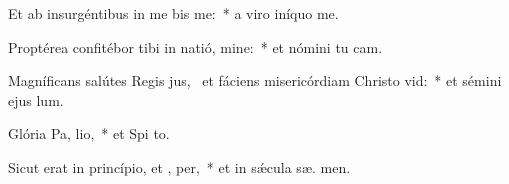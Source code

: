 \item Et ab insurgéntibus in me bis me:~* a viro iníquo  me.
\item Proptérea confitébor tibi in natió, mine:~* et nómini tu  cam.
\item Magníficans salútes Regis jus,~\pscross{} et fáciens misericórdiam Christo  vid:~* et sémini ejus   lum.
\item Glória Pa,  lio,~* et Spi to.
\item Sicut erat in princípio, et ,  per,~* et in sǽcula sæ. men.
